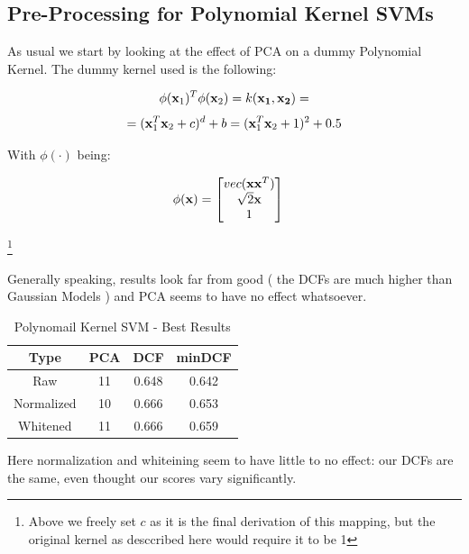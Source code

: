 \documentclass[12pt, twocolumn]{article}
\begin{document}
\subsection{Pre-Processing for Polynomial Kernel SVMs}

As usual we start by looking at the effect of PCA on a dummy Polynomial Kernel. The dummy kernel used is the following:

$$ \phi({\bf x}_1)^T\phi({\bf x}_2) = k({\bf x_1}, {\bf x_2}) = $$
$$ = ({\bf x}_1^T{\bf x}_2 + c)^d + b = ({\bf x}_1^T{\bf x}_2+1)^2+0.5$$

With $\phi(\cdot)$ being:

\begin{center}
    \begin{align}
        \phi({\bf x}) & = \begin{bmatrix}
                            vec({\bf x}{\bf x}^T) \\
                            \sqrt{2}{\bf x} \\
                            1 \\
                      \end{bmatrix}
    \end{align}
\end{center}
\footnote{Above we freely set $c$ as it is the final derivation of this mapping, but the original kernel as desccribed here would require it to be 1}

Generally speaking, results look far from good ( the DCFs are much higher than Gaussian Models ) and PCA seems to have no effect whatsoever.

\begin{table}[H]
    \centering
        \begin{tabular}{||c|c|c|c||}
            \hline
            Type & PCA & DCF & minDCF \\
            \hline
            \hline
            Raw & 11 & 0.648 &  0.642 \\
            Normalized & 10 & 0.666 &  0.653 \\
            Whitened & 11 & 0.666 &  0.659 \\
            \hline
    \end{tabular}
    \caption{Polynomail Kernel SVM - Best Results}
\end{table}

Here normalization and whiteining seem to have little to no effect: our DCFs are the same, even thought our scores vary significantly.
\end{document}
